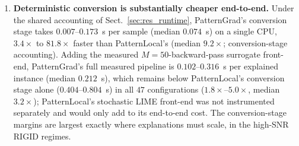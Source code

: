 \documentclass[pdflatex,sn-mathphys-num]{sn-jnl}
\theoremstyle{thmstyleone}
\theoremstyle{thmstyletwo}%
\theoremstyle{thmstylethree}%
\begin{document}
\begin{enumerate}
    \item \textbf{Deterministic conversion is substantially cheaper end-to-end.} Under the shared accounting of Sect.~\ref{sec:res_runtime}, PatternGrad's conversion stage takes $0.007$--$0.173$~s per sample (median $0.074$~s) on a single CPU, $3.4\times$ to $81.8\times$ faster than PatternLocal's (median $9.2\times$; conversion-stage accounting). Adding the measured $M = 50$-backward-pass surrogate front-end, PatternGrad's full measured pipeline is $0.102$--$0.316$~s per explained instance (median $0.212$~s), which remains below PatternLocal's conversion stage alone ($0.404$--$0.804$~s) in all $47$ configurations ($1.8\times$--$5.0\times$, median $3.2\times$); PatternLocal's stochastic LIME front-end was not instrumented separately and would only add to its end-to-end cost. The conversion-stage margins are largest exactly where explanations must scale, in the high-SNR RIGID regimes.

\end{enumerate}
\end{document}
